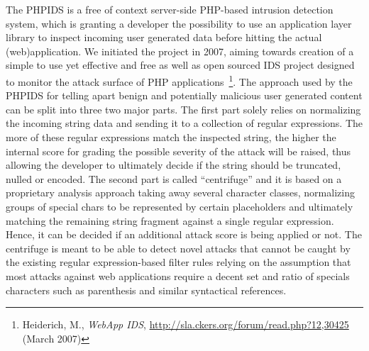       The PHPIDS is a free of context server-side PHP-based intrusion detection system, which is granting a developer the possibility to use an application layer library to inspect incoming user generated data before hitting the actual (web)application. We initiated the project in 2007, aiming towards creation of a simple to use yet effective and free as well as open sourced IDS project designed to monitor the attack surface of PHP applications~\footnote{Heiderich, M., \textit{WebApp IDS}, \url{http://sla.ckers.org/forum/read.php?12,30425} (March 2007)}. The approach used by the PHPIDS for telling apart benign and potentially malicious user generated content can be split into three two major parts. The first part solely relies on normalizing the incoming string data and sending it to a collection of regular expressions. The more of these regular expressions match the inspected string, the higher the internal score for grading the possible severity of the attack will be raised, thus allowing the developer to 
ultimately decide if the string should be truncated, nulled or encoded. The second part is called ``centrifuge'' and it is based on a proprietary analysis approach taking away several character classes, normalizing groups of special chars to be represented by certain placeholders and ultimately matching the remaining string fragment against a single regular expression. Hence, it can be decided if an additional attack score is being applied or not. The centrifuge is meant to be able to detect novel attacks that cannot be caught by the existing regular expression-based filter rules relying on the assumption that most attacks against web applications require a decent set and ratio of specials characters such as parenthesis and similar syntactical references.\\

